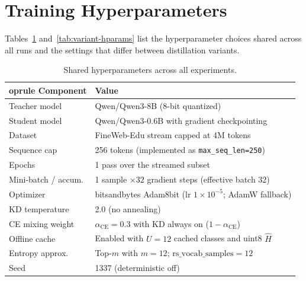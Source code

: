\documentclass[11pt]{article}
\begin{document}



\appendix
\section{Training Hyperparameters}
\label{app:hyperparams}

Tables~\ref{tab:shared-hparams} and~\ref{tab:variant-hparams} list the hyperparameter choices shared across all runs and the settings that differ between distillation variants.

\begin{table}[h]
	\centering
	\small
	\setlength{\tabcolsep}{8pt}
\begin{tabular}{ll}
	oprule
Component & Value \\
\midrule
Teacher model & Qwen/Qwen3-8B (8-bit quantized) \\
Student model & Qwen/Qwen3-0.6B with gradient checkpointing \\
Dataset & FineWeb-Edu stream capped at 4M tokens \\
Sequence cap & 256 tokens (implemented as \texttt{max\_seq\_len=250}) \\
Epochs & 1 pass over the streamed subset \\
Mini-batch / accum. & 1 sample \(\times 32\) gradient steps (effective batch 32) \\
Optimizer & bitsandbytes Adam8bit (lr $1\times 10^{-5}$; AdamW fallback) \\
KD temperature & 2.0 (no annealing) \\
CE mixing weight & $\alpha_{\text{CE}}=0.3$ with KD always on ($1-\alpha_{\text{CE}}$) \\
Offline cache & Enabled with $U=12$ cached classes and uint8 $\hat H$ \\
Entropy approx. & Top-$m$ with $m=12$; $\text{rs\_vocab\_samples}=12$ \\
Seed & 1337 (deterministic off) \\
\bottomrule
\end{tabular}
\caption{Shared hyperparameters across all experiments.}
\label{tab:shared-hparams}
\end{table}
\end{document}
